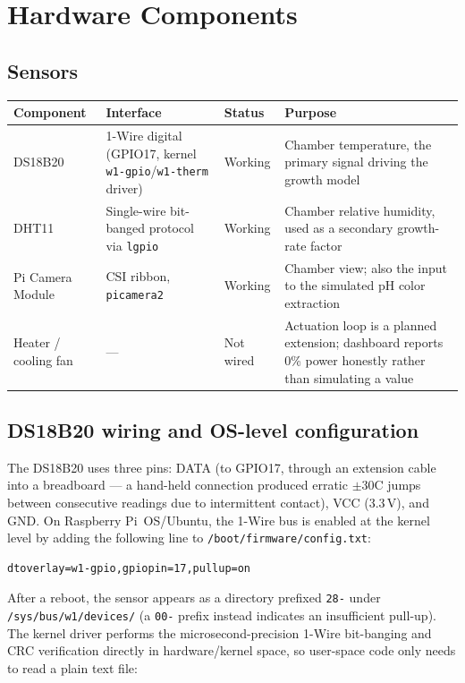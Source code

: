 \documentclass[11pt]{article}
\begin{document}
\section{Hardware Components}

\subsection{Sensors}

\begin{center}
\begin{tabular}{@{}p{3.3cm}p{3.6cm}p{3cm}p{4.5cm}@{}}
\toprule
\textbf{Component} & \textbf{Interface} & \textbf{Status} & \textbf{Purpose} \\
\midrule
DS18B20 & 1-Wire digital (GPIO17, kernel \texttt{w1-gpio}/\texttt{w1-therm} driver) & Working & Chamber temperature, the primary signal driving the growth model \\
DHT11 & Single-wire bit-banged protocol via \texttt{lgpio} & Working & Chamber relative humidity, used as a secondary growth-rate factor \\
Pi Camera Module & CSI ribbon, \texttt{picamera2} & Working & Chamber view; also the input to the simulated pH color extraction \\
Heater / cooling fan & --- & Not wired & Actuation loop is a planned extension; dashboard reports 0\% power honestly rather than simulating a value \\
\bottomrule
\end{tabular}
\end{center}

\subsection{DS18B20 wiring and OS-level configuration}

The DS18B20 uses three pins: DATA (to GPIO17, through an extension cable into a breadboard --- a hand-held connection produced erratic $\pm$30\textdegree{}C jumps between consecutive readings due to intermittent contact), VCC (3.3\,V), and GND. On Raspberry Pi~OS/Ubuntu, the 1-Wire bus is enabled at the kernel level by adding the following line to \texttt{/boot/firmware/config.txt}:

\begin{lstlisting}
dtoverlay=w1-gpio,gpiopin=17,pullup=on
\end{lstlisting}

After a reboot, the sensor appears as a directory prefixed \texttt{28-} under \texttt{/sys/bus/w1/devices/} (a \texttt{00-} prefix instead indicates an insufficient pull-up). The kernel driver performs the microsecond-precision 1-Wire bit-banging and CRC verification directly in hardware/kernel space, so user-space code only needs to read a plain text file:
\end{document}
